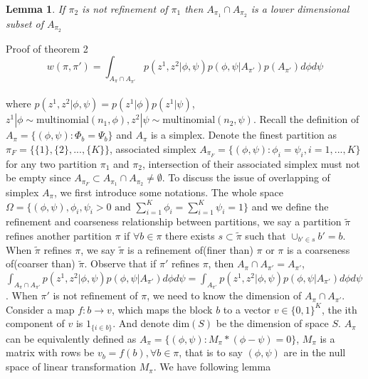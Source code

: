 \documentclass[11pt]{amsart}
\newtheorem{lemma}{Lemma}
\begin{document}
\section{}
\hfill\\
\begin{lemma}
If $\pi_2$ is not refinement of $\pi_1$ then $A_{\pi_1} \cap A_{\pi_2}$ is a lower dimensional subset of $A_{\pi_2}$
\end{lemma}
Proof of theorem 2
\[
w(\pi, \pi') = \int_{A_\pi\cap A_{\pi'}}p(z^1,z^2|\phi,\psi)p(\phi, \psi | A_{\pi'})p(A_{\pi'})d\phi d\psi
\]
\\
where $p(z^1,z^2|\phi,\psi) = p(z^1|\phi)p(z^1|\psi)$, $z^1|\phi \sim \text{multinomial}(n_1, \phi), z^2|\psi \sim \text{multinomial}(n_2, \psi)$. Recall the definition of $A_\pi = \{(\phi,\psi): \Phi_b = \Psi_b\}$ and $A_\pi$ is a simplex. Denote the finest partition as $\pi_{F} = \{ \{1\}, \{2\},...,\{K\}\}$, associated simplex $A_{\pi_{F}} = \{(\phi, \psi): \phi_i = \psi_i, i = 1,...,K\}$ for any two partition $\pi_1$ and $\pi_2$, intersection of their associated simplex must not be empty since $A_{\pi_{F}}\subset A_{\pi_1}\cap A_{\pi_2} \neq \emptyset$.  To discuss the issue of overlapping of simplex $A_\pi$, we first introduce some notations. The whole space $\Omega = \{ (\phi,\psi), \phi_i,\psi_i > 0 \text{ and } \sum_{i=1}^K \phi_i = \sum_{i=1}^K \psi_i = 1\}$ and we define the refinement and coarseness relationship between partitions, we say a partition $\tilde{\pi}$ refines another partition $\pi$ if $\forall b \in \pi$ there exists $s \subset \tilde{\pi}$  such that $\cup_{b'\in s} b' = b$. When $\tilde{\pi}$ refines $\pi$, we say $\tilde{\pi}$ is a refinement of(finer than) $\pi$ or $\pi$ is a coarseness of(coarser than) $\tilde{\pi}$. 
Observe that if $\pi'$ refines $\pi$, then $A_\pi \cap A_{\pi'} = A_{\pi'}$, $\int_{A_\pi\cap A_{\pi'}} p(z^1,z^2|\phi,\psi)p(\phi, \psi | A_{\pi'})d\phi d\psi = \int_{A_{\pi'}} p(z^1,z^2|\phi,\psi)p(\phi, \psi | A_{\pi'})d\phi d\psi $. When $\pi'$ is not refinement of $\pi$, we need to know the dimension of $A_\pi\cap A_{\pi'}$. Consider a map $f: b \rightarrow v$, which maps the block $b$ to a vector $v\in \{0, 1\}^K$, the ith component of $v$ is $1_{\{i\in b\}}$. And denote $\text{dim}(S)$ be the dimension of space $S$. $A_\pi$ can be equivalently defined as $A_\pi =  \{(\phi,\psi): M_\pi * (\phi - \psi) = 0\}$, $M_\pi$ is a matrix with rows be $v_b = f(b), \forall b\in \pi$, that is to say $(\phi,\psi)$ are in the null space of linear transformation $M_\pi$.  We have following lemma\\
\end{document}
